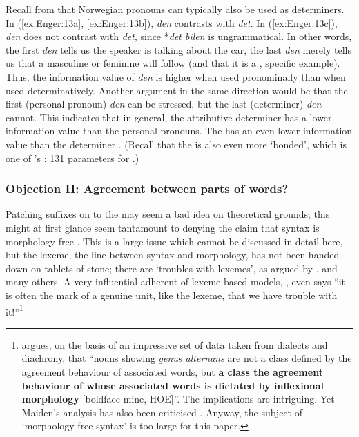 \documentclass[output=paper]{langsci/langscibook}
\begin{document}
\begin{exe}
\begin{xlist}
\begin{xlist}
Recall from  that Norwegian pronouns can typically also be used as
determiners. In (\ref{ex:Enger:13a}, \ref{ex:Enger:13b}), \emph{den} contrasts with \emph{det}. In (\ref{ex:Enger:13c}),
\emph{den} does not contrast with \emph{det}, since *\emph{det bilen} is
ungrammatical. In other words, the first \emph{den} tells us the speaker
is talking about the car, the last \emph{den} merely tells us that a
masculine or feminine will follow (and that it is a , specific example). Thus, the information value of \emph{den} is higher when used
pronominally than when used determinatively. Another argument in the
same direction would be that the first (personal pronoun) \emph{den} can
be stressed, but the last (determiner) \emph{den} cannot. This indicates
that in general, the attributive determiner has a lower information
value than the personal pronouns. The  has an even lower
information value than the determiner %
\citep[cf.][123]{Dahl15}%
%
. (Recall that
the  is also even more `bonded', which is one of %
\citeauthor{Lehmann15}'s \citeyear{Lehmann15}%
%
:
131 parameters for .)

\subsubsection{Objection II: Agreement between parts of words?}
\label{sec:enger:3.2.3}
\largerpage[-1]
Patching suffixes on to the  may seem a bad idea on
theoretical grounds; this might at first glance seem tantamount to
denying the claim that syntax is morphology-free %
\citep[38f]{Zwicky92,Corbett14}%
%
. This is a large issue which cannot be discussed in detail
here, but the lexeme, the line between syntax and morphology, has not
been handed down on tablets of stone; there are `troubles with lexemes',
as argued by %
\citet{Fradin03b}%
%
, %
\citet{Haspelmath2011} %
%
and many
others. A very influential adherent of lexeme-based models, %
\citet[100]{Matthews91}%
%
, even says ``it is often the mark of a genuine unit, like
the lexeme, that we have trouble with it!''\footnote{%
\citet{Maiden16c}
  argues, on the basis of an impressive set of data taken from dialects
  and diachrony, that  ``nouns showing \emph{genus alternans}
  are not a class defined by the agreement behaviour of associated
  words, but \textbf{a class the agreement behaviour of whose associated
  words is dictated by inflexional morphology} {[}boldface mine,
  HOE{]}''. The implications are intriguing. Yet Maiden's analysis has
  also been criticised %
\citep[by][]{Loporcaro16}%
%
. Anyway, the subject of
  `morphology-free syntax' is too large for this paper.}


\end{xlist}
\end{xlist}
\end{exe}
\end{document}
